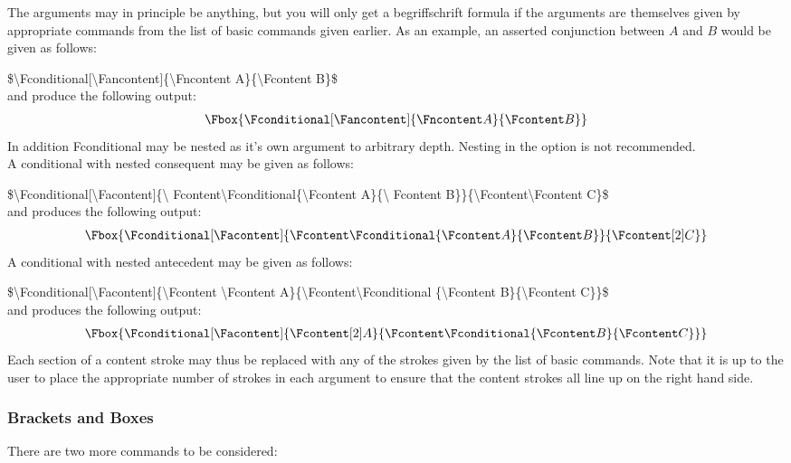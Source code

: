 \documentclass[12pt]{article}
\begin{document}
  The arguments may in principle be anything, but you will only get a begriffschrift 
  formula if the arguments are themselves given by appropriate commands from the list 
  of basic commands given earlier. As an example, an asserted conjunction between $A$ 
  and $B$ would be given as follows:

  \$\textbackslash Fconditional[\textbackslash Fancontent]\{\textbackslash Fncontent 
  A\}\{\textbackslash Fcontent B\}\$ \\
  and produce the following output: 
  \begin{align*}
    \Fbox{\Fconditional[\Fancontent]{\Fncontent A}{\Fcontent B}}
  \end{align*}
  In addition Fconditional may be nested as it's own argument to arbitrary depth. 
  Nesting in the option is not recommended. \\
  A conditional with nested consequent may be given as follows:

  \$\textbackslash Fconditional[\textbackslash Facontent]\{\textbackslash 
  Fcontent\textbackslash Fconditional\{\textbackslash Fcontent A\}\{\textbackslash 
  Fcontent B\}\}\{\textbackslash Fcontent\textbackslash Fcontent C\}\$\\
  and produces the following output:
  \begin{align*}
    \Fbox{\Fconditional[\Facontent]{\Fcontent\Fconditional{\Fcontent A}
    {\Fcontent B}}{\Fcontent[2] C}}
  \end{align*}
  A conditional with nested antecedent may be given as follows:

  \$\textbackslash Fconditional[\textbackslash Facontent]\{\textbackslash Fcontent 
  \textbackslash Fcontent A\}\{\textbackslash Fcontent\textbackslash Fconditional 
  \{\textbackslash Fcontent B\}\{\textbackslash Fcontent C\}\}\$\\
  and produces the following output:
  \begin{align*}
    \Fbox{\Fconditional[\Facontent]{\Fcontent[2] A}{\Fcontent\Fconditional%
    {\Fcontent B}{\Fcontent C}}}
  \end{align*}
  Each section of a content stroke may thus be replaced with any of the strokes given 
  by the list of basic commands. Note that it is up to the user to place the 
  appropriate number of strokes in each argument to ensure that the content strokes 
  all line up on the right hand side.

\subsubsection{Brackets and Boxes}
  There are two more commands to be considered: 
\end{document}
